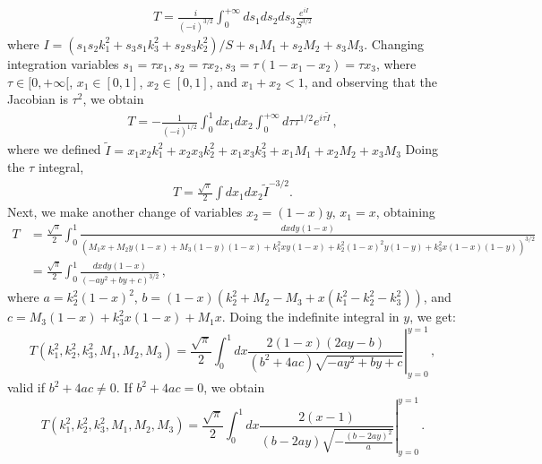 \documentclass[twoside]{article}
\begin{document}
\begin{align}
  T = \frac{i}{(-i)^{3/2}}\int_0^{+\infty} ds_1 ds_2 ds_3\frac{e^{iI}}{S^{3/2}}
\end{align}
where $I = (s_1s_2k^2_1 + s_3s_1k^2_3 + s_2s_3k^2_2)/S + s_1M_1 + s_2M_2 + s_3M_3$. Changing integration variables $s_1 = \tau x_1, s_2 =
\tau x_2, s_3 = \tau(1 - x_1 - x_2) = \tau x_3$, where $\tau \in [0,+\infty[$, $x_1 \in [0,1]$, $x_2 \in [0,1]$, and $x_1 + x_2 < 1$, and observing that the Jacobian is $\tau^2$, we obtain
\begin{align}
  T = -\frac{1}{(-i)^{1/2}}\int_0^1 dx_1 dx_2 \int_0^{+\infty}d\tau \tau^{1/2}e^{i\tau \tilde{I}}\,,
\end{align}
where we defined $\tilde{I} = x_1 x_2 k^2_1 + x_2 x_3 k^2_2 + x_1 x_3 k^2_3 + x_1 M_1 + x_2 M_2 + x_3 M_3$ 
Doing the $\tau$ integral,
\begin{align}
  T = \frac{\sqrt{\pi}}{2}\int dx_1 dx_2\tilde{I}^{-3/2}.
\end{align}
Next, we make another change of variables $x_2  = (1 - x)y,\, x_1 = x$, obtaining
\begin{align}
T&=\frac{\sqrt{\pi}}{2}\int_0^1 \frac{dx dy (1-x)}{\left( M_1 x +  M_2 y (1-x) + M_3 (1-y) (1-x) + k^2_1 x y (1-x) + k^2_2 (1-x)^2 y (1-y) + k^2_3 x (1-x)(1-y) \right)^{3/2}}\\
& = \frac{\sqrt{\pi}}{2}\int_0^1 \frac{dx dy (1-x)}{\left(-ay^2 + by + c \right)^{3/2}}\,, \label{eq:Tsame}
\end{align}
where $a = k_2^2 (1-x)^2$, $b = (1-x)(k_2^2 + M_2 - M_3+x(k_1^2-k_2^2-k_3^2))$, and $c = M_3(1-x) + k_3^2 x (1-x) + M_1 x$.
Doing the indefinite integral in $y$, we get:
\begin{equation}
T(k^2_1, k^2_2, k^2_3, M_1, M_2, M_3) =\frac{\sqrt{\pi}}{2}\int_0^1 dx \left.\frac{2(1-x) (2 a y - b)}{\left(b^2 + 4 a c\right) \sqrt{-ay^2 + by + c}}\right|^{y = 1}_{y = 0}\,,
\end{equation}
valid if $b^2 + 4 a c \neq 0$. If $b^2 + 4 a c = 0$, we obtain
\begin{equation}
T(k^2_1, k^2_2, k^2_3, M_1, M_2, M_3) =\frac{\sqrt{\pi}}{2}\int_0^1 dx \left.\frac{2 (x-1)}{(b-2 a y) \sqrt{-\frac{(b-2 a y)^2}{a}}}\right|^{y = 1}_{y = 0}\,.
\end{equation}
\end{document}
